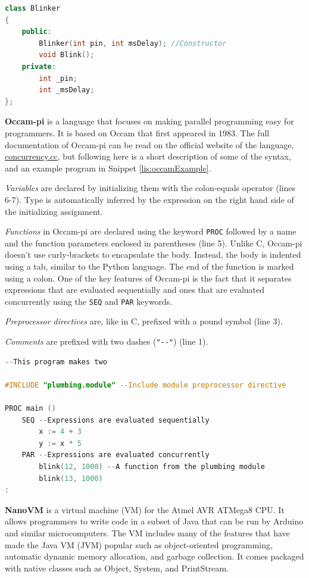 \begin{lstlisting}[language=C++,label=lis:arduinoHeader,caption=The Blinker.h header file.,firstnumber=1]
class Blinker
{
	public:
		Blinker(int pin, int msDelay); //Constructor
		void Blink();
	private:
		int _pin;
		int _msDelay;
};
\end{lstlisting}

\textbf{Occam-pi} is a language that focuses on making parallel programming easy for programmers.
It is based on Occam that first appeared in 1983.
The full documentation of Occam-pi can be read on the official website of the language, \url{concurrency.cc}, but following here is a short description of some of the syntax, and an example program in Snippet \ref{lis:occamExample}.

\textit{Variables} are declared by initializing them with the colon-equals operator (lines 6-7). 
Type is automatically inferred by the expression on the right hand side of the initializing assignment.

\textit{Functions} in Occam-pi are declared using the keyword \texttt{PROC} followed by a name and the function parameters enclosed in parentheses (line 5).
Unlike C, Occam-pi doesn't use curly-brackets to encapsulate the body.
Instead, the body is indented using a tab, similar to the Python language.
The end of the function is marked using a colon.
One of the key features of Occam-pi is the fact that it separates expressions that are evaluated sequentially and ones that are evaluated concurrently using the \texttt{SEQ} and \texttt{PAR} keywords.

\textit{Preprocessor directives} are, like in C, prefixed with a pound symbol (line 3).

\textit{Comments} are prefixed with two dashes (\texttt{"{-}{-}"}) (line 1).

\begin{lstlisting}[language=C,label=lis:occamExample,caption=An example program written in Occam-pi.,firstnumber=1]
--This program makes two 

#INCLUDE "plumbing.module" --Include module preprocessor directive

PROC main ()
	SEQ --Expressions are evaluated sequentially
		x := 4 + 3
		y := x * 5
	PAR --Expressions are evaluated concurrently
		blink(12, 1000) --A function from the plumbing module
		blink(13, 1000)
:
\end{lstlisting}

\textbf{NanoVM} is a virtual machine (VM) for the Atmel AVR ATMega8 CPU.
It allows programmers to write code in a subset of Java that can be run by Arduino and similar microcomputers.
The VM includes many of the features that have made the Java VM (JVM) popular such as object-oriented programming, automatic dynamic memory allocation, and garbage collection.
It comes packaged with native classes such as Object, System, and PrintStream.

